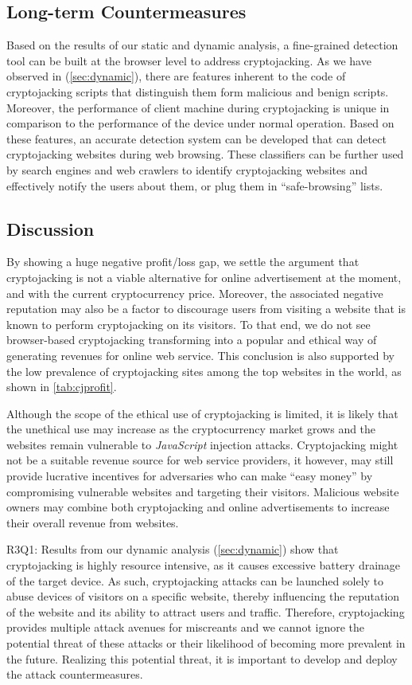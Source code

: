 \documentclass[acmlarge]{acmart}
\newcommand{\js}{{\em JavaScript}\xspace}
\newcommand{\cc}{{cryptocurrency}\xspace}
\newcommand{\cj}{cryptojacking\xspace}
\begin{document}
\subsection{Long-term Countermeasures} \label{sec:fd}
Based on the results of our static and dynamic analysis, a fine-grained detection tool can be built at the browser level to address \cj. As we have observed in (\textsection\ref{sec:dynamic}), there are features inherent to the code of \cj scripts that distinguish them form malicious and benign scripts. Moreover, the performance of client machine during \cj is unique in comparison to the performance of the device under normal operation. Based on these features, an accurate detection system can be developed that can detect \cj websites during web browsing. These classifiers can be further used by search engines and web crawlers to identify \cj websites and effectively notify the users about them, or plug them in ``safe-browsing'' lists. 
\subsection{Discussion} \label{sec:discussion} 

By showing a huge negative profit/loss gap, we settle the argument that \cj is not a viable alternative for online advertisement at the moment, and with the current cryptocurrency price. Moreover, the associated negative reputation may also be a factor to discourage users from visiting a website that is known to perform \cj on its visitors. To that end, we do not see browser-based \cj transforming into a popular and ethical way of generating revenues for online web service. This conclusion is also supported by the low prevalence of \cj sites among the top websites in the world, as shown in \autoref{tab:cjprofit}. 

Although the scope of the ethical use of \cj is limited, it is likely that the unethical use may increase as the \cc market grows and the websites remain vulnerable to \js injection attacks. Cryptojacking might not be a suitable revenue source for web service providers, it however, may still provide lucrative incentives for adversaries who can make ``easy money'' by compromising vulnerable websites and targeting their visitors. Malicious website owners may combine both \cj and online advertisements to increase their overall revenue from websites.  

{\color{blue}R3Q1: Results from our dynamic analysis (\textsection\ref{sec:dynamic}) show that \cj is highly resource intensive, as it causes excessive battery drainage of the target device. As such, \cj attacks can be launched solely to abuse devices of visitors on a specific website, thereby influencing the reputation of the website and its ability to attract users and traffic. Therefore, \cj provides multiple attack avenues for miscreants and we cannot ignore the potential threat of these attacks or their likelihood of becoming more prevalent in the future. Realizing this potential threat, it is important to develop and deploy the attack countermeasures.}
\end{document}

